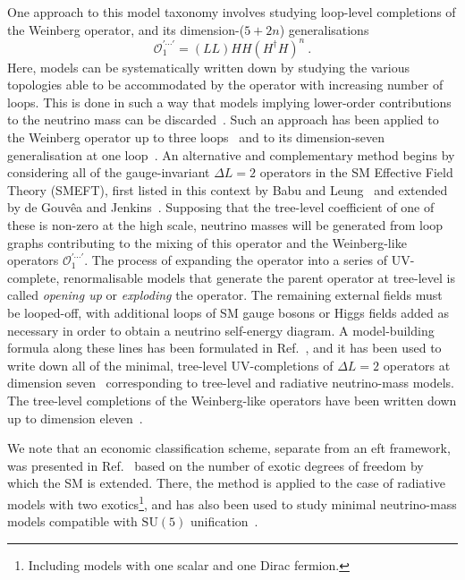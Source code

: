 One approach to this model taxonomy involves studying loop-level completions of
the Weinberg operator, and its dimension-($5+2n$) generalisations
\begin{equation*}
  \mathcal{O}_1^{\prime \cdots \prime} = (LL)HH(H^\dagger H)^n  \ .
\end{equation*}
Here, models can be systematically written down by studying the various
topologies able to be accommodated by the operator with increasing number of
loops. This is done in such a way that models implying lower-order contributions
to the neutrino mass can be discarded~\cite{Farzan:2012ev}. Such an approach has
been applied to the Weinberg operator up to three loops~\cite{Bonnet:2012kz,
  Sierra:2014rxa, Cepedello:2018rfh} and to its dimension-seven generalisation
at one loop~\cite{Cepedello:2017eqf}. An alternative and complementary method
begins by considering all of the gauge-invariant $\Delta L = 2$ operators in the
SM Effective Field Theory (SMEFT), first listed in this context by Babu and
Leung~\cite{Babu:2001ex} and extended by de Gouv\^{e}a and
Jenkins~\cite{deGouvea:2007qla}. Supposing that the tree-level coefficient of
one of these is non-zero at the high scale, neutrino masses will be generated
from loop graphs contributing to the mixing of this operator and the
Weinberg-like operators $\mathcal{O}_1^{\prime \cdots \prime}$. The process of
expanding the operator into a series of UV-complete, renormalisable models that
generate the parent operator at tree-level is called \emph{opening up} or
\emph{exploding} the operator. The remaining external fields must be looped-off,
with additional loops of SM gauge bosons or Higgs fields added as necessary in
order to obtain a neutrino self-energy diagram. A model-building formula along
these lines has been formulated in Ref.~\cite{PhysRevD.87.073007}, and it has
been used to write down all of the minimal, tree-level UV-completions of
$\Delta L = 2$ operators at dimension seven~\cite{Cai:2014kra} corresponding to
tree-level and radiative neutrino-mass models. The tree-level completions of the
Weinberg-like operators have been written down up to dimension
eleven~\cite{Cai:2014kra, Bonnet:2009ej, Anamiati:2018cuq}.

We note that an economic classification scheme, separate from an eft framework,
was presented in Ref.~\cite{Klein:2019iws} based on the number of exotic degrees
of freedom by which the SM is extended. There, the method is applied to the case
of radiative models with two exotics\footnote{Including models with one scalar
  and one Dirac fermion.}, and has also been used to study minimal neutrino-mass
models compatible with $\mathrm{SU}(5)$ unification~\cite{Klein:2019jgb}.

